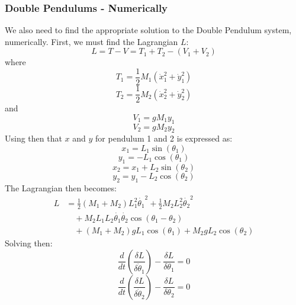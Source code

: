 \documentclass{article}
\begin{document}
\subsubsection{Double Pendulums - Numerically}
We also need to find the appropriate solution to the Double Pendulum system, numerically. First, we must find the Lagrangian $L$:
\begin{equation*}
    L = T-V = T_1 + T_2 - (V_1 + V_2)
\end{equation*}
where
\begin{equation*}
    T_1 = \frac{1}{2} M_1 \left(\dot x_1^2 + \dot y_1^2\right)
\end{equation*}
\begin{equation*}
    T_2 = \frac{1}{2} M_2 \left(\dot x_2^2 + \dot y_2^2 \right)
\end{equation*}
and
\begin{equation*}
    V_1 = gM_1y_1 
\end{equation*}
\begin{equation*}
    V_2 = g M_2 y_2
\end{equation*}
Using then that $x$ and $y$ for pendulum 1 and 2 is expressed as:
\begin{equation*}
    x_1  = L_1 \sin(\theta_1)
\end{equation*}
\begin{equation*}
    y_1 = -L_1 \cos(\theta_1)
\end{equation*}
\begin{equation*}
    x_2 = x_1 + L_2 \sin(\theta_2)
\end{equation*}
\begin{equation*}
    y_2 = y_1 - L_2 \cos(\theta_2)
\end{equation*}
The Lagrangian then becomes:
\begin{equation*}
\begin{aligned}
L &= \frac{1}{2} (M_1 + M_2) L_1^2 \dot{\theta_1}^2 + \frac{1}{2} M_2 L_2^2 \dot{\theta_2}^2 \\
&\quad+ M_2 L_1 L_2 \dot{\theta_1} \dot{\theta_2} \cos(\theta_1 - \theta_2) \\
&\quad+ (M_1 + M_2) g L_1 \cos(\theta_1) + M_2 g L_2 \cos(\theta_2)
\end{aligned}
\end{equation*}
Solving then:
\begin{equation*}
    \frac{d}{dt} \left( \frac{\delta L}{\delta \dot \theta_1}\right) - \frac{\delta L}{\delta \theta_1} = 0
\end{equation*}
\begin{equation*}
    \frac{d}{dt} \left( \frac{\delta L}{\delta \dot \theta_2}\right) - \frac{\delta L}{\delta \theta_2} = 0
\end{equation*}
\end{document}
